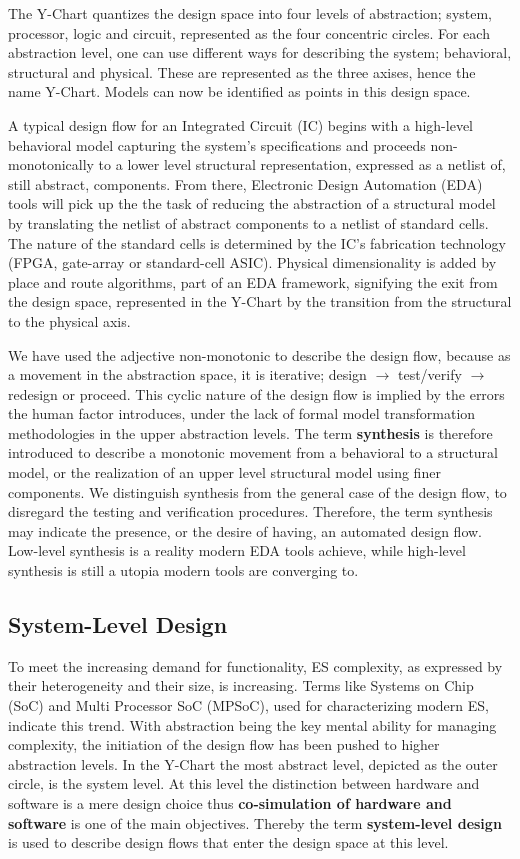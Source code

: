 \documentclass[12pt,twoside]{article}
\begin{document}
The Y-Chart quantizes the design space into four levels of abstraction; system, processor, logic and circuit, represented as the four concentric circles.
For each abstraction level, one can use different ways for describing the system; behavioral, structural and physical.
These are represented as the three axises, hence the name Y-Chart.
Models can now be identified as points in this design space.

A typical design flow for an Integrated Circuit (IC) begins with a high-level behavioral model capturing the system's specifications and 
proceeds non-monotonically to a lower level structural representation, expressed as a netlist of, still abstract, components.
From there, Electronic Design Automation (EDA) tools will pick up the the task of reducing the abstraction of a structural model by translating the netlist of abstract components to a netlist of standard cells.
The nature of the standard cells is determined by the IC's fabrication technology (FPGA, gate-array or standard-cell ASIC).
Physical dimensionality is added by place and route algorithms, 
part of an EDA framework, 
signifying the exit from the design space, 
represented in the Y-Chart by the transition from the structural to the physical axis.

We have used the adjective non-monotonic to describe the design flow, because as a movement in the abstraction space, it is iterative; 
design $\rightarrow$ test/verify $\rightarrow$ redesign or proceed.
This cyclic nature of the design flow is implied by the errors the human factor introduces, under the lack of formal model transformation methodologies in the upper abstraction levels.
The term \textbf{synthesis} is therefore introduced to describe a monotonic movement from a behavioral to a structural model, or the realization of an upper level structural model using finer components.
We distinguish synthesis from the general case of the design flow, to disregard the testing and verification procedures.
Therefore, the term synthesis may indicate the presence, or the desire of having, an automated design flow.
Low-level synthesis is a reality modern EDA tools achieve, while high-level synthesis is still a utopia modern tools are converging to.


\subsection{System-Level Design}
\label{sec-3-3}
To meet the increasing demand for functionality, ES complexity, as expressed by their heterogeneity and their size, is increasing.
Terms like Systems on Chip (SoC) and Multi Processor SoC (MPSoC), used for characterizing modern ES, indicate this trend.
With abstraction being the key mental ability for managing complexity, the initiation of the design flow has been pushed to higher abstraction levels.
In the Y-Chart the most abstract level, depicted as the outer circle, is the system level.
At this level the distinction between hardware and software is a mere design choice thus \textbf{co-simulation of hardware and software} is one of the main objectives.
Thereby the term \textbf{system-level design} is used to describe design flows that enter the design space at this level.
\end{document}
